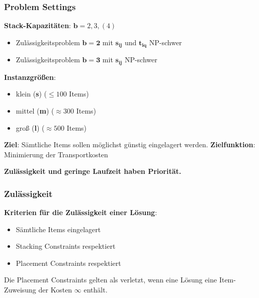 \documentclass{beamer}
\begin{document}
\begin{frame}
\frametitle{Problem Settings}

\textbf{Stack-Kapazitäten}: $\boldsymbol{b} = 2, 3, (4)$
\begin{itemize}
  \item Zulässigkeitsproblem $\boldsymbol{b=2}$ mit $\boldsymbol{s_{ij}}$ und $\boldsymbol{t_{iq}}$ NP-schwer
  \item Zulässigkeitsproblem $\boldsymbol{b=3}$ mit $\boldsymbol{s_{ij}}$ NP-schwer
\end{itemize}

\textbf{Instanzgrößen}:
\begin{itemize}
  \item klein (\textbf{s}) ($\leq 100$ Items)
  \item mittel (\textbf{m}) ($\approx 300$ Items)
  \item groß (\textbf{l}) ($\approx 500$ Items)\newline
\end{itemize}

\textbf{Ziel}: Sämtliche Items sollen möglichst günstig eingelagert werden.\newline
\textbf{Zielfunktion}: Minimierung der Transportkosten\newline

\textbf{Zulässigkeit und geringe Laufzeit haben Priorität.}\newline
\end{frame}

\begin{frame}
\frametitle{Zulässigkeit}
\textbf{Kriterien für die Zulässigkeit einer Lösung}:
\begin{itemize}
  \item Sämtliche Items eingelagert
  \item Stacking Constraints respektiert
  \item Placement Constraints respektiert
\end{itemize}

Die Placement Constraints gelten als verletzt, wenn eine Lösung eine Item-Zuweisung der Kosten $\infty$ enthält.
\end{frame}
\end{document}
